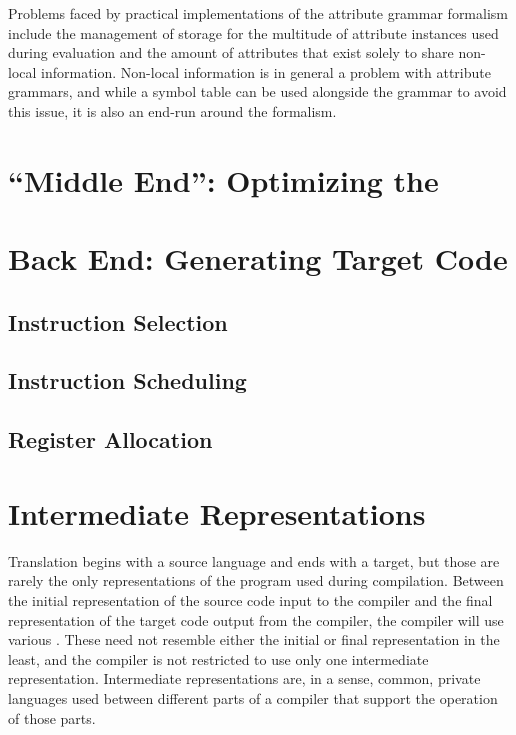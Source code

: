 Problems faced by practical implementations of the attribute grammar formalism include the management of storage for the multitude of attribute instances used during evaluation and the amount of attributes that exist solely to share non-local information. Non-local information is in general a problem with attribute grammars, and while a symbol table can be used alongside the grammar to avoid this issue, it is also an end-run around the formalism.


\section{``Middle End'': Optimizing the }

\section{Back End: Generating Target Code}
\subsection{Instruction Selection}

\subsection{Instruction Scheduling}

\subsection{Register Allocation}

\section{Intermediate Representations}
Translation begins with a source language and ends with a target, but those are rarely the only representations of the program used during compilation. Between the initial representation of the source code input to the compiler and the final representation of the target code output from the compiler, the compiler will use various . These need not resemble either the initial or final representation in the least, and the compiler is not restricted to use only one intermediate representation. Intermediate representations are, in a sense, common, private languages used between different parts of a compiler that support the operation of those parts.

